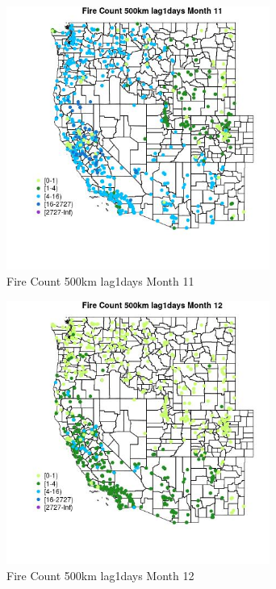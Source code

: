 \begin{figure} 
\centering  
\includegraphics[width=0.77\textwidth]{Code_Outputs/Report_ML_input_PM25_Step4_part_f_de_duplicated_aveswNAs_MapObsMo11Fire_Count_500km_lag1days.jpg} 
\caption{\label{fig:Report_ML_input_PM25_Step4_part_f_de_duplicated_aveswNAsMapObsMo11Fire_Count_500km_lag1days}Fire Count 500km lag1days Month 11} 
\end{figure} 
 

\begin{figure} 
\centering  
\includegraphics[width=0.77\textwidth]{Code_Outputs/Report_ML_input_PM25_Step4_part_f_de_duplicated_aveswNAs_MapObsMo12Fire_Count_500km_lag1days.jpg} 
\caption{\label{fig:Report_ML_input_PM25_Step4_part_f_de_duplicated_aveswNAsMapObsMo12Fire_Count_500km_lag1days}Fire Count 500km lag1days Month 12} 
\end{figure} 
 

